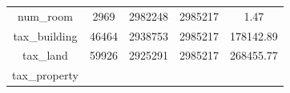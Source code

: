 \documentclass[]{book}
\theoremstyle{definition}
\theoremstyle{definition}
\theoremstyle{definition}
\theoremstyle{remark}
\begin{document}
\begin{longtable}[]{@{}ccccc@{}}
\begin{minipage}[t]{0.33\columnwidth}
num\_room\strut
\end{minipage} & \begin{minipage}[t]{0.12\columnwidth}\centering\strut
2969\strut
\end{minipage} & \begin{minipage}[t]{0.13\columnwidth}\centering\strut
2982248\strut
\end{minipage} & \begin{minipage}[t]{0.12\columnwidth}\centering\strut
2985217\strut
\end{minipage} & \begin{minipage}[t]{0.13\columnwidth}\centering\strut
1.47\strut
\end{minipage}\tabularnewline
\begin{minipage}[t]{0.33\columnwidth}\centering\strut
tax\_building\strut
\end{minipage} & \begin{minipage}[t]{0.12\columnwidth}\centering\strut
46464\strut
\end{minipage} & \begin{minipage}[t]{0.13\columnwidth}\centering\strut
2938753\strut
\end{minipage} & \begin{minipage}[t]{0.12\columnwidth}\centering\strut
2985217\strut
\end{minipage} & \begin{minipage}[t]{0.13\columnwidth}\centering\strut
178142.89\strut
\end{minipage}\tabularnewline
\begin{minipage}[t]{0.33\columnwidth}\centering\strut
tax\_land\strut
\end{minipage} & \begin{minipage}[t]{0.12\columnwidth}\centering\strut
59926\strut
\end{minipage} & \begin{minipage}[t]{0.13\columnwidth}\centering\strut
2925291\strut
\end{minipage} & \begin{minipage}[t]{0.12\columnwidth}\centering\strut
2985217\strut
\end{minipage} & \begin{minipage}[t]{0.13\columnwidth}\centering\strut
268455.77\strut
\end{minipage}\tabularnewline
\begin{minipage}[t]{0.33\columnwidth}\centering\strut
tax\_property\strut
\end{minipage} & \begin{minipage}[t]{0.12\columnwidth}\centering\strut

\end{minipage}
\end{longtable}
\end{document}
